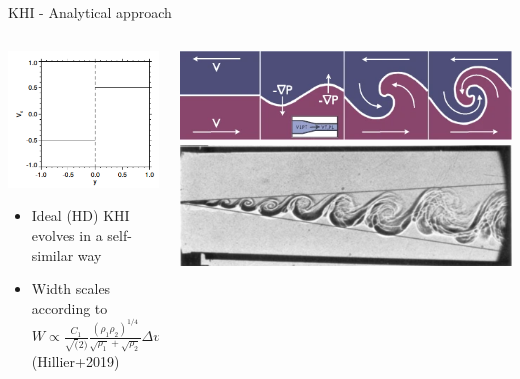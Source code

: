 \documentclass[10pt,aspectratio=169,usenames,dvipsnames]{beamer}
\begin{document}
\begin{frame}{KHI - Analytical approach}
\begin{columns}
\begin{column}{0.4\textwidth}
\includegraphics[width=0.95\linewidth]{2023Dundee/Figures/khiinterface.png}
\begin{itemize}
    \item Ideal (HD) KHI evolves in a self-similar way
    \item Width scales according to $W\propto \frac{C_1}{\sqrt(2)} \frac{\left( \rho_1 \rho_2 \right)^{1/4}}{\sqrt{\rho_1}+\sqrt{\rho_2}} \Delta v_t$ (Hillier+2019)
\end{itemize}
\end{column}
\begin{column}{0.6\textwidth}
\includegraphics[width=0.95\linewidth]{2023Dundee/Figures/khischematic.png} \\
\includegraphics[width=0.95\linewidth]{2023Dundee/Figures/selfsimilar.png} \\

\end{column}
\end{columns}
\end{frame}
\end{document}
